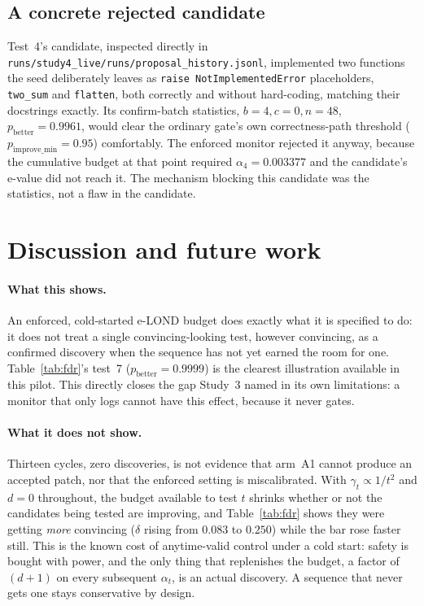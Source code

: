 \documentclass[11pt]{article}
\begin{document}
\subsection{A concrete rejected candidate}

Test~4's candidate, inspected directly in \texttt{runs/study4\_live/runs/proposal\_history.jsonl}, implemented two functions the seed deliberately leaves as \texttt{raise NotImplementedError} placeholders, \texttt{two\_sum} and \texttt{flatten}, both correctly and without hard-coding, matching their docstrings exactly. Its confirm-batch statistics, $b=4,c=0,n=48$, $p_\text{better}=0.9961$, would clear the ordinary gate's own correctness-path threshold ($p_\text{improve\_min}=0.95$) comfortably. The enforced monitor rejected it anyway, because the cumulative budget at that point required $\alpha_4=0.003377$ and the candidate's e-value did not reach it. The mechanism blocking this candidate was the statistics, not a flaw in the candidate.

\section{Discussion and future work}
\label{sec:discussion}

\paragraph{What this shows.} An enforced, cold-started e-LOND budget does exactly what it is specified to do: it does not treat a single convincing-looking test, however convincing, as a confirmed discovery when the sequence has not yet earned the room for one. Table~\ref{tab:fdr}'s test~7 ($p_\text{better}=0.9999$) is the clearest illustration available in this pilot. This directly closes the gap Study~3 named in its own limitations: a monitor that only logs cannot have this effect, because it never gates.

\paragraph{What it does not show.} Thirteen cycles, zero discoveries, is not evidence that arm~A1 cannot produce an accepted patch, nor that the enforced setting is miscalibrated. With $\gamma_t \propto 1/t^2$ and $d=0$ throughout, the budget available to test $t$ shrinks whether or not the candidates being tested are improving, and Table~\ref{tab:fdr} shows they were getting \emph{more} convincing ($\delta$ rising from $0.083$ to $0.250$) while the bar rose faster still. This is the known cost of anytime-valid control under a cold start: safety is bought with power, and the only thing that replenishes the budget, a factor of $(d+1)$ on every subsequent $\alpha_t$, is an actual discovery. A sequence that never gets one stays conservative by design.
\end{document}
